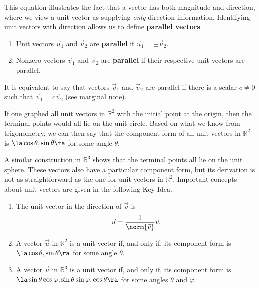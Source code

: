 This equation illustrates the fact that a vector has both magnitude and direction, where we view a unit vector as supplying \textit{only} direction information. Identifying unit vectors with direction allows us to define \textbf{parallel vectors}.

{\begin{enumerate}
	\item Unit vectors $\vec u_1$ and $\vec u_2$ are \textbf{parallel} if $\vec u_1 = \pm \vec u_2$.
	\item	Nonzero vectors $\vec v_1$ and $\vec v_2$ are \textbf{parallel} if their respective unit vectors are parallel.
\end{enumerate}
}

It is equivalent to say that vectors $\vec v_1$ and $\vec v_2$ are parallel if there is a scalar $c\neq 0$ such that $\vec v_1 = c\vec v_2$ (see marginal note).

If one graphed all unit vectors in $\mathbb{R}^2$ with the initial point at the origin, then the terminal points would all lie on the unit circle. Based on what we know from trigonometry, we can then say that the component form of all unit vectors in $\mathbb{R}^2$ is $\la \cos\theta,\sin\theta\ra$ for some angle $\theta$.

A similar construction in $\mathbb{R}^3$ shows that the terminal points all lie on the unit sphere. These vectors also have a particular component form, but its derivation is not as straightforward as the one for unit vectors in $\mathbb{R}^2$. Important concepts about unit vectors are given in the  following Key Idea. 

{\begin{enumerate}
\item		The unit vector in the direction of $\vec v$ is $$ \vec u = \frac1{\norm{\vec v}} \vec v.$$

\item A vector $\vec u$ in $\mathbb{R}^2$ is a unit vector if, and only if, its component form is $\la \cos\theta,\sin\theta\ra$ for some angle $\theta$.
	\item		A vector $\vec u$ in $\mathbb{R}^3$ is a unit vector if, and only if, its component form is $\la \sin\theta\cos\varphi,\sin\theta\sin\varphi,\cos\theta\ra$ for some angles $\theta$ and $\varphi$.
\end{enumerate}
}

